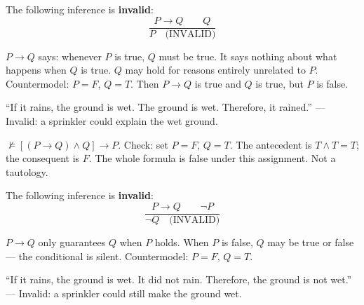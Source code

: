 \begin{tcolorbox}[colback=propbox, colframe=propborder, arc=2pt,
  left=6pt, right=6pt, top=4pt, bottom=4pt,
  title={\small\textbf{Definition (Affirming the Consequent)}},
  fonttitle=\small\bfseries]
\label{def:aff-cons}
The following inference is \textbf{invalid}:
\[
\frac{P \rightarrow Q \qquad Q}{P \quad \text{(INVALID)}}
\]
\end{tcolorbox}

\begin{remark}
$P \rightarrow Q$ says: whenever $P$ is true, $Q$ must be true. It says nothing
about what happens when $Q$ is true. $Q$ may hold for reasons entirely unrelated
to $P$. Countermodel: $P = F$, $Q = T$. Then $P \rightarrow Q$ is true and $Q$
is true, but $P$ is false.
\end{remark}

\begin{remark}
``If it rains, the ground is wet. The ground is wet. Therefore, it rained.''
— Invalid: a sprinkler could explain the wet ground.
\end{remark}

\begin{remark}
$\not\models [(P \rightarrow Q) \wedge Q] \rightarrow P$.
Check: set $P = F$, $Q = T$. The antecedent is $T \wedge T = T$; the consequent
is $F$. The whole formula is false under this assignment. Not a tautology.
\end{remark}

\begin{tcolorbox}[colback=propbox, colframe=propborder, arc=2pt,
  left=6pt, right=6pt, top=4pt, bottom=4pt,
  title={\small\textbf{Definition (Denying the Antecedent)}},
  fonttitle=\small\bfseries]
\label{def:deny-ant}
The following inference is \textbf{invalid}:
\[
\frac{P \rightarrow Q \qquad \neg P}{\neg Q \quad \text{(INVALID)}}
\]
\end{tcolorbox}

\begin{remark}
$P \rightarrow Q$ only guarantees $Q$ when $P$ holds. When $P$ is false, $Q$
may be true or false — the conditional is silent. Countermodel: $P = F$, $Q = T$.
\end{remark}

\begin{remark}
``If it rains, the ground is wet. It did not rain. Therefore, the ground is not
wet.'' — Invalid: a sprinkler could still make the ground wet.
\end{remark}

